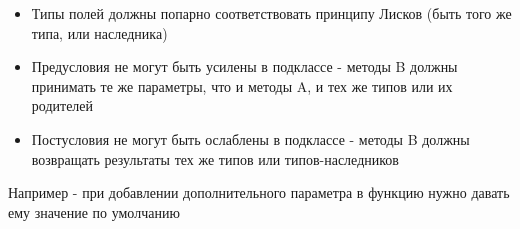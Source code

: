 \documentclass{article}
\begin{document}
\begin{itemize}
    \item Типы полей должны попарно соответствовать принципу Лисков (быть того же типа, 
            или наследника)
    \item Предусловия не могут быть усилены в подклассе - методы B должны принимать 
          те же параметры, что и методы A, и тех же типов или их родителей
    \item Постусловия не могут быть ослаблены в подклассе - методы B должны возвращать
          результаты тех же типов или типов-наследников
\end{itemize}
    Например - при добавлении дополнительного параметра в функцию нужно 
    давать ему значение по умолчанию
\newpage

\end{document}
